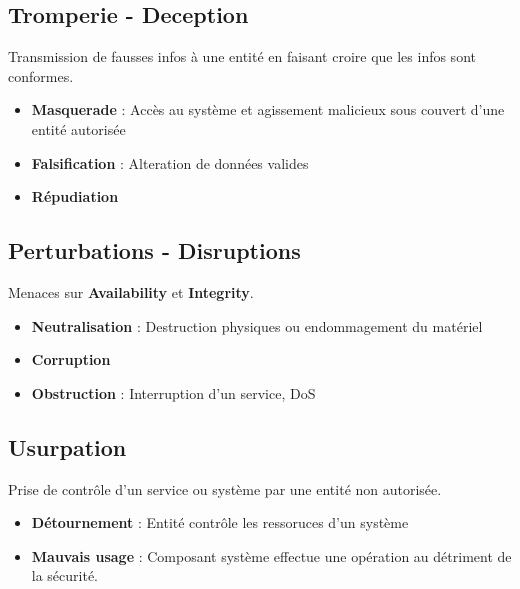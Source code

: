 \documentclass{report}
\begin{document}
		\subsection{Tromperie - Deception}

			Transmission de fausses infos à une entité en faisant croire que les infos sont conformes. \\

			\begin{itemize}
				\item \textbf{Masquerade} : Accès au système et agissement malicieux sous couvert d'une entité autorisée
				\item \textbf{Falsification} : Alteration de données valides
				\item \textbf{Répudiation}\\
			\end{itemize}

		\subsection{Perturbations - Disruptions}

			Menaces sur \textbf{Availability} et \textbf{Integrity}.\\

			\begin{itemize}
				\item \textbf{Neutralisation} : Destruction physiques ou endommagement du matériel
				\item \textbf{Corruption}
				\item \textbf{Obstruction} : Interruption d'un service, DoS\\
			\end{itemize}

		\subsection{Usurpation}

			Prise de contrôle d'un service ou système par une entité non autorisée.\\

			\begin{itemize}
				\item \textbf{Détournement} : Entité contrôle les ressoruces d'un système
				\item \textbf{Mauvais usage} : Composant système effectue une opération au détriment de la sécurité.\\
			\end{itemize}
\end{document}
